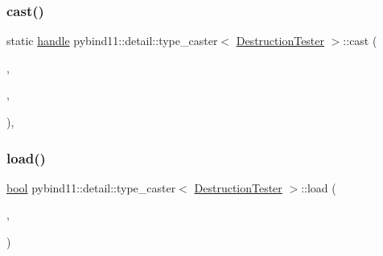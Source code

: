 \subsubsection{\texorpdfstring{cast()}{cast()}}
{\footnotesize\ttfamily static \mbox{\hyperlink{classhandle}{handle}} pybind11\+::detail\+::type\+\_\+caster$<$ \mbox{\hyperlink{class_destruction_tester}{Destruction\+Tester}} $>$\+::cast (\begin{DoxyParamCaption}\item[{const \mbox{\hyperlink{class_destruction_tester}{Destruction\+Tester}} \&}]{,  }\item[{\mbox{\hyperlink{detail_2common_8h_adde72ab1fb0dd4b48a5232c349a53841}{return\+\_\+value\+\_\+policy}}}]{,  }\item[{\mbox{\hyperlink{classhandle}{handle}}}]{ }\end{DoxyParamCaption})\hspace{0.3cm}{\ttfamily [inline]}, {\ttfamily [static]}}

\mbox{\label{structpybind11_1_1detail_1_1type__caster_3_01_destruction_tester_01_4_af3270287ab2f7311379ecab27d311ab9}} 
\subsubsection{\texorpdfstring{load()}{load()}}
{\footnotesize\ttfamily \mbox{\hyperlink{asdl_8h_af6a258d8f3ee5206d682d799316314b1}{bool}} pybind11\+::detail\+::type\+\_\+caster$<$ \mbox{\hyperlink{class_destruction_tester}{Destruction\+Tester}} $>$\+::load (\begin{DoxyParamCaption}\item[{\mbox{\hyperlink{classhandle}{handle}}}]{,  }\item[{\mbox{\hyperlink{asdl_8h_af6a258d8f3ee5206d682d799316314b1}{bool}}}]{ }\end{DoxyParamCaption})\hspace{0.3cm}{\ttfamily [inline]}}

\mbox{\label{structpybind11_1_1detail_1_1type__caster_3_01_destruction_tester_01_4_acdd082fc19a5b7231d25e79ada337017}} 
